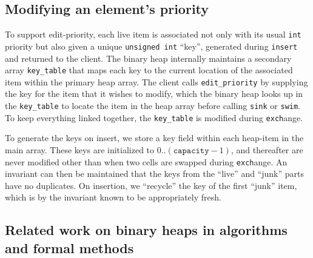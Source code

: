 \subsection{Modifying an element's priority}
\label{sec:modpri}


To support edit-priority, each live item is associated not only with its usual \texttt{int} priority
but also given a unique \texttt{unsigned int} ``key'', generated during \texttt{insert} and returned to the client.
The binary heap internally maintains a secondary array \texttt{key\_table} that maps each key to the current location of the associated item within the primary heap array. The client calls \texttt{edit\_priority} by supplying the key for the item that it wishes to modify, which the binary heap looks up in the \texttt{key\_table} to
locate the item in the heap array before calling \texttt{sink} or \texttt{swim}. To keep everything linked together, the \texttt{key\_table} is modified during \texttt{exch}ange.

To generate the keys on insert, we store a key field within each heap-item in the main array.  These keys are initialized to $0..(\texttt{capacity}-1)$, and thereafter are never modified other than when two cells are swapped during \texttt{exch}ange.  An invariant can then be maintained that the keys from the ``live'' and ``junk'' parts have no duplicates.  On insertion, we ``recycle'' the key of the first ``junk'' item, which is by the invariant known to be appropriately fresh.


\subsection{Related work on binary heaps in algorithms and formal methods}
\label{sec:relworkbinheap}

